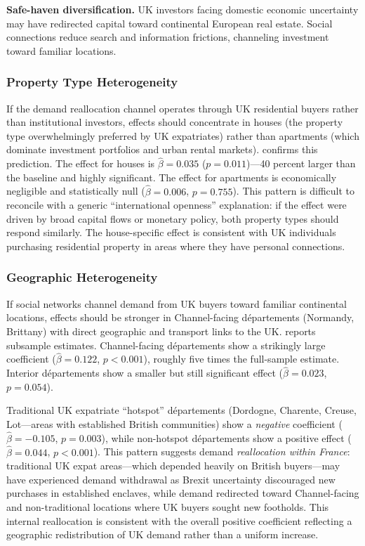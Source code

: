 \documentclass[12pt]{article}
\begin{document}
\textbf{Safe-haven diversification.} UK investors facing domestic economic uncertainty may have redirected capital toward continental European real estate. Social connections reduce search and information frictions, channeling investment toward familiar locations.

\subsubsection{Property Type Heterogeneity}

If the demand reallocation channel operates through UK residential buyers rather than institutional investors, effects should concentrate in houses (the property type overwhelmingly preferred by UK expatriates) rather than apartments (which dominate investment portfolios and urban rental markets).  confirms this prediction. The effect for houses is $\hat{\beta} = 0.035$ ($p = 0.011$)---40 percent larger than the baseline and highly significant. The effect for apartments is economically negligible and statistically null ($\hat{\beta} = 0.006$, $p = 0.755$). This pattern is difficult to reconcile with a generic ``international openness'' explanation: if the effect were driven by broad capital flows or monetary policy, both property types should respond similarly. The house-specific effect is consistent with UK individuals purchasing residential property in areas where they have personal connections.



\subsubsection{Geographic Heterogeneity}

If social networks channel demand from UK buyers toward familiar continental locations, effects should be stronger in Channel-facing d\'epartements (Normandy, Brittany) with direct geographic and transport links to the UK.  reports subsample estimates. Channel-facing d\'epartements show a strikingly large coefficient ($\hat{\beta} = 0.122$, $p < 0.001$), roughly five times the full-sample estimate. Interior d\'epartements show a smaller but still significant effect ($\hat{\beta} = 0.023$, $p = 0.054$).

Traditional UK expatriate ``hotspot'' d\'epartements (Dordogne, Charente, Creuse, Lot---areas with established British communities) show a \textit{negative} coefficient ($\hat{\beta} = -0.105$, $p = 0.003$), while non-hotspot d\'epartements show a positive effect ($\hat{\beta} = 0.044$, $p < 0.001$). This pattern suggests demand \textit{reallocation within France}: traditional UK expat areas---which depended heavily on British buyers---may have experienced demand withdrawal as Brexit uncertainty discouraged new purchases in established enclaves, while demand redirected toward Channel-facing and non-traditional locations where UK buyers sought new footholds. This internal reallocation is consistent with the overall positive coefficient reflecting a geographic redistribution of UK demand rather than a uniform increase.
\end{document}
